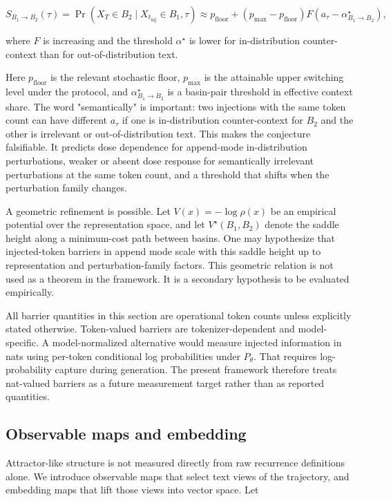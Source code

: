 \documentclass{article}
\theoremstyle{plain}
\theoremstyle{definition}
\begin{document}
\[S_{B_1\to B_2}(\tau)
=
\Pr(X_T\in B_2\mid X_{t_{\mathrm{inj}}}\in B_1,\tau)
\approx
p_{\mathrm{floor}}+
(p_{\max}-p_{\mathrm{floor}})
F(a_\tau-\alpha^\star_{B_1\to B_2}),\]

where \(F\) is increasing and the threshold \(\alpha^\star\) is lower for in-distribution counter-context than for out-of-distribution text.

Here \(p_{\mathrm{floor}}\) is the relevant stochastic floor, \(p_{\max}\) is the attainable upper switching level under the protocol, and \(\alpha^\star_{B_1\to B_2}\) is a basin-pair threshold in effective context share. The word "semantically" is important: two injections with the same token count can have different \(a_\tau\) if one is in-distribution counter-context for \(B_2\) and the other is irrelevant or out-of-distribution text. This makes the conjecture falsifiable. It predicts dose dependence for append-mode in-distribution perturbations, weaker or absent dose response for semantically irrelevant perturbations at the same token count, and a threshold that shifts when the perturbation family changes.

A geometric refinement is possible. Let \(V(x)=-\log\rho(x)\) be an empirical potential over the representation space, and let \(V^\star(B_1,B_2)\) denote the saddle height along a minimum-cost path between basins. One may hypothesize that injected-token barriers in append mode scale with this saddle height up to representation and perturbation-family factors. This geometric relation is not used as a theorem in the framework. It is a secondary hypothesis to be evaluated empirically.

All barrier quantities in this section are operational token counts unless explicitly stated otherwise. Token-valued barriers are tokenizer-dependent and model-specific. A model-normalized alternative would measure injected information in nats using per-token conditional log probabilities under \(P_\theta\). That requires log-probability capture during generation. The present framework therefore treats nat-valued barriers as a future measurement target rather than as reported quantities.

\subsection{Observable maps and embedding}

Attractor-like structure is not measured directly from raw recurrence definitions alone. We introduce observable maps that select text views of the trajectory, and embedding maps that lift those views into vector space. Let
\end{document}
